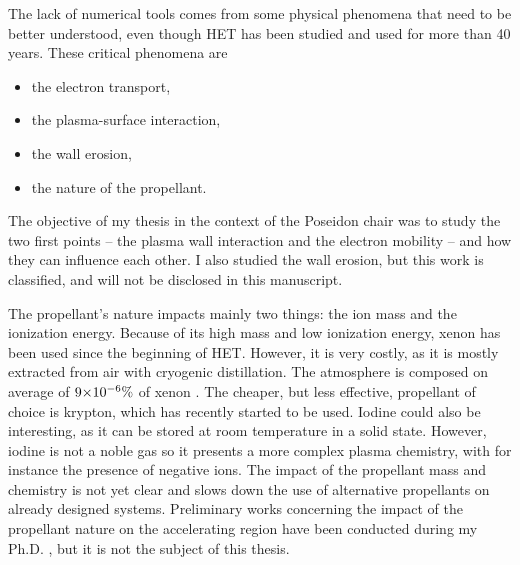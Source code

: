 The lack of numerical tools comes from some physical phenomena that need to be better understood, even though \ac{HET} has been studied and used for more than 40 years.
These critical phenomena are \citep{samukawa2012,adamovich2017}
\begin{itemize}
  \item the electron transport,
  \item the plasma-surface interaction,
  \item the wall erosion,
  \item the nature of the propellant.
\end{itemize}


\vspace{1em}
The objective of my thesis in the context of the {\sc Poseidon} chair was to study the two first points -- the plasma wall interaction and the electron mobility -- and how they can influence each other.
I also studied the wall erosion, but this work is classified, and will not be disclosed in this manuscript.

The propellant's nature impacts mainly two things\string: the ion mass and the ionization energy.
Because of its high mass and low ionization energy, xenon has been used since the beginning of \ac{HET}. 
However, it is very costly, as it is mostly extracted from air with cryogenic distillation.
The atmosphere is composed on average of ${{9}{\times}10^{-6}}\%$ of xenon \citep{earthfacs}.
The cheaper, but less effective, propellant of choice is krypton, which has recently started to be used.
Iodine could also be interesting, as it can be stored at room temperature in a solid state.
However, iodine is not a noble gas so it presents a more complex plasma chemistry, with for instance the presence of negative ions.
The impact of the propellant mass and chemistry is not yet clear and slows down the use of alternative propellants on already designed systems.
Preliminary works concerning the impact of the propellant nature on the accelerating region have been conducted during my Ph.D. \citep{croes2018}, but it is not the subject of this thesis.



